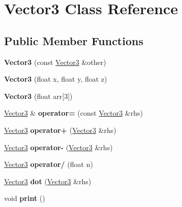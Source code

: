 \hypertarget{class_vector3}{}\section{Vector3 Class Reference}
\label{class_vector3}
\subsection*{Public Member Functions}
\begin{DoxyCompactItemize}
\item 
\mbox{\label{class_vector3_aad6b7d343e46f9d930139ebf3195a886}} 
{\bfseries Vector3} (const \mbox{\hyperlink{class_vector3}{Vector3}} \&other)
\item 
\mbox{\label{class_vector3_ad53e22b52babdb90d423601f72467590}} 
{\bfseries Vector3} (float x, float y, float z)
\item 
\mbox{\label{class_vector3_a976712a6d78485facd87a07f689ffadf}} 
{\bfseries Vector3} (float arr\mbox{[}3\mbox{]})
\item 
\mbox{\label{class_vector3_a0edfaf32d40f9c40c694088fe2c46af7}} 
\mbox{\hyperlink{class_vector3}{Vector3}} \& {\bfseries operator=} (const \mbox{\hyperlink{class_vector3}{Vector3}} \&rhs)
\item 
\mbox{\label{class_vector3_ae29858b30586df4c855aa9be90bd8cd0}} 
\mbox{\hyperlink{class_vector3}{Vector3}} {\bfseries operator+} (\mbox{\hyperlink{class_vector3}{Vector3}} \&rhs)
\item 
\mbox{\label{class_vector3_ab750fc3d6e61dbc6e724a1660d61c892}} 
\mbox{\hyperlink{class_vector3}{Vector3}} {\bfseries operator-\/} (\mbox{\hyperlink{class_vector3}{Vector3}} \&rhs)
\item 
\mbox{\label{class_vector3_ac0520d82b831dd7ec9e27b9ce802683c}} 
\mbox{\hyperlink{class_vector3}{Vector3}} {\bfseries operator/} (float n)
\item 
\mbox{\label{class_vector3_ac259eb9dd038c9c2bb67783e10e43748}} 
\mbox{\hyperlink{class_vector3}{Vector3}} {\bfseries dot} (\mbox{\hyperlink{class_vector3}{Vector3}} \&rhs)
\item 
\mbox{\label{class_vector3_aa2d4b629b2d1260a49a88bd98c48934a}} 
void {\bfseries print} ()
\end{DoxyCompactItemize}
